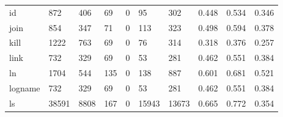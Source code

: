 \begin{longtable}{lp{1.3cm}p{1.3cm}p{1.3cm}p{1.3cm}p{1.3cm}p{1.3cm}p{1.3cm}p{1.3cm}p{1.3cm}}
id        &                    872 &                                406 &                                69 &                                0 &                                95 &                             302 &                                0.448 &                                  0.534 &                                0.346 \\
join      &                    854 &                                347 &                                71 &                                0 &                               113 &                             323 &                                0.498 &                                  0.594 &                                0.378 \\
kill      &                   1222 &                                763 &                                69 &                                0 &                                76 &                             314 &                                0.318 &                                  0.376 &                                0.257 \\
link      &                    732 &                                329 &                                69 &                                0 &                                53 &                             281 &                                0.462 &                                  0.551 &                                0.384 \\
ln        &                   1704 &                                544 &                               135 &                                0 &                               138 &                             887 &                                0.601 &                                  0.681 &                                0.521 \\
logname   &                    732 &                                329 &                                69 &                                0 &                                53 &                             281 &                                0.462 &                                  0.551 &                                0.384 \\
ls        &                  38591 &                               8808 &                               167 &                                0 &                             15943 &                           13673 &                                0.665 &                                  0.772 &                                0.354 \\

\end{longtable}
